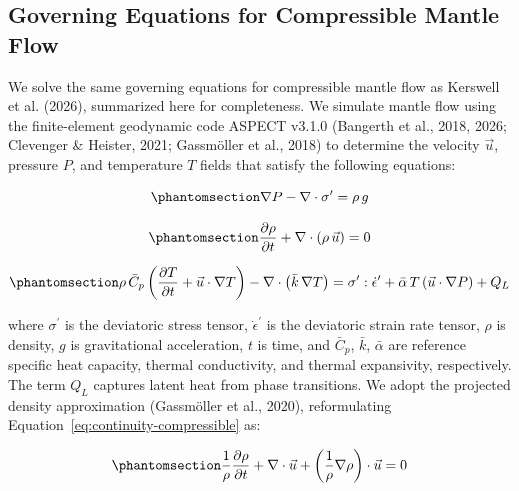 \documentclass[draft,linenumbers]{agujournal2019}
\begin{document}
\subsection{Governing Equations for Compressible Mantle
Flow}\label{sec:governing-equations-for-compressible-mantle-flow}

We solve the same governing equations for compressible mantle flow as
Kerswell et al. (2026), summarized here for completeness. We simulate
mantle flow using the finite-element geodynamic code ASPECT v3.1.0
(Bangerth et al., 2018, 2026; Clevenger \& Heister, 2021; Gassmöller et
al., 2018) to determine the velocity \(\vec{u}\), pressure \(P\), and
temperature \(T\) fields that satisfy the following equations:

\begin{equation}\protect\phantomsection\label{eq:navier-stokes-no-inertia}{\nabla P - \nabla \cdot \sigma^{\prime} = \rho\, g}\end{equation}

\begin{equation}\protect\phantomsection\label{eq:continuity-compressible}{\frac{\partial \rho}{\partial t} + \nabla \cdot (\rho\, \vec{u}) = 0}\end{equation}

\begin{equation}\protect\phantomsection\label{eq:energy}{\rho\, \bar{C}_p \left(\frac{\partial T}{\partial t} + \vec{u} \cdot \nabla T \right) - \nabla \cdot \left(\bar{k}\, \nabla T \right) = \sigma^{\prime} : \dot{\epsilon}^{\prime} + \bar{\alpha}\, T \left(\vec{u} \cdot \nabla P \right) + Q_L}\end{equation}

where \(\sigma^{\prime}\) is the deviatoric stress tensor,
\(\dot{\epsilon}^{\prime}\) is the deviatoric strain rate tensor,
\(\rho\) is density, \(g\) is gravitational acceleration, \(t\) is time,
and \(\bar{C}_p\), \(\bar{k}\), \(\bar{\alpha}\) are reference specific
heat capacity, thermal conductivity, and thermal expansivity,
respectively. The term \(Q_L\) captures latent heat from phase
transitions. We adopt the projected density approximation (Gassmöller et
al., 2020), reformulating Equation~\ref{eq:continuity-compressible} as:

\begin{equation}\protect\phantomsection\label{eq:continuity-expanded}{\frac{1}{\rho} \frac{\partial \rho}{\partial t} + \nabla \cdot \vec{u} + \left(\frac{1}{\rho} \nabla \rho \right) \cdot \vec{u} = 0}\end{equation}
\end{document}
